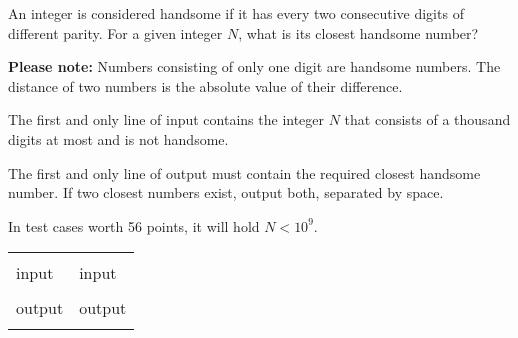 \renewcommand{\taskname}{ZGODAN}
\renewcommand{\timelimit}{1 second}
\renewcommand{\memorylimit}{32 MB}
\renewcommand{\score}{120 points}

An integer is considered handsome if it has every two consecutive digits of different parity.
For a given integer $N$, what is its closest handsome number?

\textbf{Please note:} Numbers consisting of only one digit are handsome numbers. The distance of two numbers is the absolute value of their difference.

\strut


The first and only line of input contains the integer $N$ that consists of a thousand digits at most and is not handsome.

\strut
{}

The first and only line of output must contain the required closest handsome number. If two closest numbers exist, output both, separated by space.

\strut
{}

In test cases worth 56 points, it will hold $N < 10^9$.

\strut


\begin{center}
\fontfamily{\ttdefault}
\fontsize{10pt}{1em}
\selectfont
\begin{tabu}to 0.99\textwidth{|X[1]|X[1]|}
\hline
& \\ 
\rowfont{\fontsize{10pt}{1em}\bfseries}
input & input \\
 &
 \\
\rowfont{\fontsize{10pt}{1em}\bfseries}
output & output \\
 &
 \\
\hline
\end{tabu}
\end{center}

{
\fontsize{10pt}{1em}
\selectfont
}